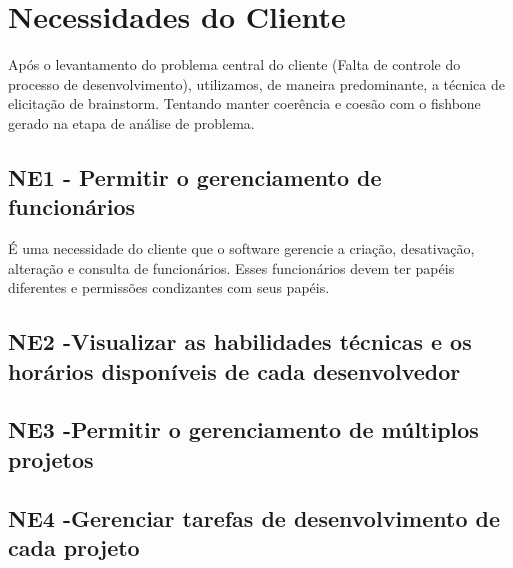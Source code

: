 \chapter{Necessidades do Cliente}

Após o levantamento do problema central do cliente (Falta de controle do processo de desenvolvimento), utilizamos, de maneira predominante, a técnica de elicitação de brainstorm. Tentando manter coerência e coesão com o fishbone gerado na etapa de análise de problema.

\section{NE1 - Permitir o gerenciamento de funcionários}

É uma necessidade do cliente que o software gerencie a criação, desativação, alteração e consulta de funcionários. Esses funcionários devem ter papéis diferentes e permissões condizantes com seus papéis. 

\section{NE2 -Visualizar as habilidades técnicas e os horários disponíveis de cada desenvolvedor}

\section{NE3 -Permitir o gerenciamento de múltiplos projetos}

\section{NE4 -Gerenciar tarefas de desenvolvimento de cada projeto}
